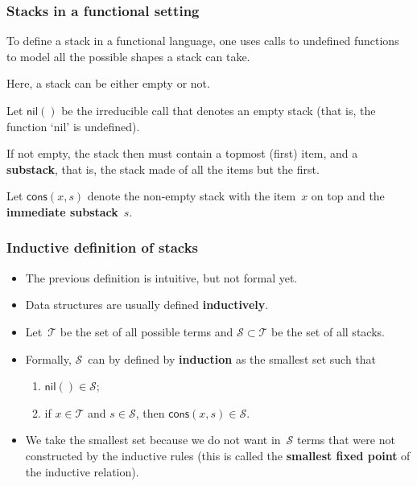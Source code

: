 \documentclass[compress,dvipdfmx]{beamer}
\newcommand\fun[1]{\textsf{#1}}
\begin{document}
\begin{frame}
  \frametitle{Stacks in a functional setting}

  To define a stack in a functional language, one uses calls to
  undefined functions to model all the possible shapes a stack can
  take.

  \bigskip

  Here, a stack can be either empty or not.

  \bigskip

  Let \(\fun{nil}()\) be the irreducible call that denotes an empty
  stack (that is, the function `\fun{nil}' is undefined).

  \bigskip

  If not empty, the stack then must contain a topmost (first) item,
  and a \textbf{substack}, that is, the stack made of all the items
  but the first.

  \bigskip

  Let \(\fun{cons}(x,s)\) denote the non\hyp{}empty stack with the
  item~\(x\) on top and the \textbf{immediate substack}~\(s\).

\end{frame}


\begin{frame}
  \frametitle{Inductive definition of stacks}

  \begin{itemize}

    \item The previous definition is intuitive, but not formal yet.

    \item Data structures are usually defined \textbf{inductively}.

    \item Let~\(\mathcal{T}\) be the set of all possible terms and
      \(\mathcal{S} \subset \mathcal{T}\) be the set of all stacks.

    \item Formally, \(\mathcal{S}\)~can by defined by
      \textbf{induction} as the smallest set such that
      \begin{enumerate}

        \item \(\fun{nil}() \in \mathcal{S}\);

        \item if \(x \in \mathcal{T}\) and \(s \in \mathcal{S}\), then
          \(\fun{cons}(x,s) \in \mathcal{S}\).
      \end{enumerate}

    \item We take the smallest set because we do not want
      in~\(\mathcal{S}\) terms that were not constructed by the
      inductive rules (this is called the \textbf{smallest fixed
        point} of the inductive relation).

  \end{itemize}

\end{frame}
\end{document}
